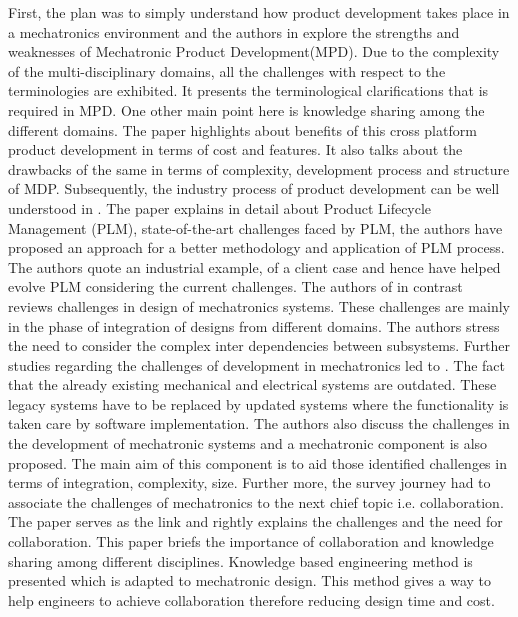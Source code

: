 First, the plan was to simply understand how product development takes place in a mechatronics environment and the authors in \cite{neumann_mechatronic_nodate} explore the strengths and weaknesses of Mechatronic Product Development(MPD). Due to the complexity of the multi-disciplinary domains, all the challenges with respect to the terminologies are exhibited. It presents the terminological clarifications that is required in MPD. One other main point here is knowledge sharing among the different domains. The paper highlights about benefits of this cross platform product development in terms of cost and features. It also talks about the drawbacks of the same in terms of complexity, development process and structure of MDP. Subsequently, the industry process of product development can be well understood in \cite{bitzer2016product}. The paper explains in detail about Product Lifecycle Management (PLM), state-of-the-art challenges faced by PLM, the authors have proposed an approach for a better methodology and application of PLM process. The authors quote an industrial example, of a client case and hence have helped evolve PLM considering the current challenges.
The authors of \cite{alvarez_cabrera_towards_2010} in contrast reviews challenges in design of mechatronics systems. These challenges are mainly in the phase of integration of designs from different domains. The authors stress the need to consider the complex inter dependencies between subsystems. Further studies regarding the challenges of development in mechatronics led to \cite{thramboulidis_challenges_2008}. The fact that the already existing mechanical and electrical systems are outdated. These legacy systems have to be replaced by updated systems where the functionality is taken care by software implementation. The authors also discuss the challenges in the development of mechatronic systems and a mechatronic component is also proposed. The main aim of this component is to aid those identified challenges in terms of integration, complexity, size. Further more, the survey journey had to associate the challenges of mechatronics to the next chief topic i.e. collaboration. The paper \cite{mcharek_knowledge_2018} serves as the link and rightly explains the challenges and the need for collaboration. This paper briefs the importance of collaboration and knowledge sharing among different disciplines. Knowledge based engineering method is presented which is adapted to mechatronic design. This method gives a way to help engineers to achieve collaboration therefore reducing design time and cost.

